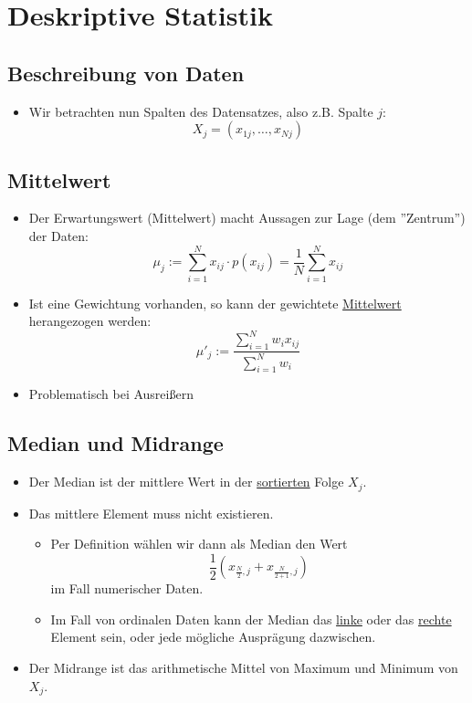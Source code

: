 \documentclass{scrartcl}
\begin{document}
\section{Deskriptive Statistik}

\subsection{Beschreibung von Daten}

\begin{itemize}
	\item Wir betrachten nun Spalten des Datensatzes, also z.B. Spalte $ j $:
	\[ X_j = (x_{1j},\ldots,x_{Nj}) \]
\end{itemize}

\subsection{Mittelwert}

\begin{itemize}
	\item Der Erwartungswert (Mittelwert) macht Aussagen zur Lage (dem 
	''Zentrum'') der Daten:
	\[ \mu_j := \sum_{i=1}^{N} x_{ij} \cdot p(x_{ij}) = \frac{1}{N} 
	\sum_{i=1}^{N} x_{ij} \]
	\item Ist eine Gewichtung vorhanden, so kann der gewichtete 
	\underline{Mittelwert} herangezogen werden:
	\[ \mu'_j := \frac{\sum_{i=1}^{N} w_i x_{ij}}{\sum_{i=1}^{N} w_i} \]
	\item Problematisch bei Ausreißern
\end{itemize}

\subsection{Median und Midrange}

\begin{itemize}
	\item Der Median ist der mittlere Wert in der \underline{sortierten} Folge 
	$ X_j $.
	\item Das mittlere Element muss nicht existieren.
	\begin{itemize}
		\item Per Definition wählen wir dann als Median den Wert
		\[ \frac{1}{2} (x_{\frac{N}{2},j} + x_{\frac{N}{2+1},j}) \]
		im Fall numerischer Daten.
		\item Im Fall von ordinalen Daten kann der Median das \underline{linke} 
		oder das \underline{rechte} Element sein, oder jede mögliche Ausprägung 
		dazwischen.
	\end{itemize}
	\item Der Midrange ist das arithmetische Mittel von Maximum und Minimum von 
	$ X_j $.
\end{itemize}
\end{document}
